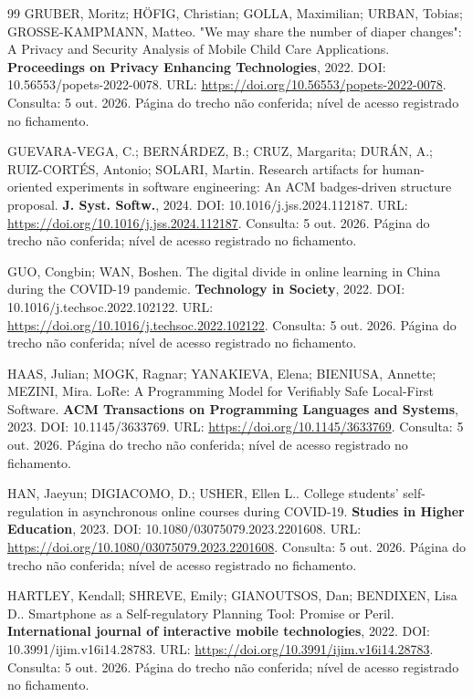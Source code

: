 \begin{thebibliography}{99}
 GRUBER, Moritz; HÖFIG, Christian; GOLLA, Maximilian; URBAN, Tobias; GROSSE-KAMPMANN, Matteo. "We may share the number of diaper changes": A Privacy and Security Analysis of Mobile Child Care Applications. \textbf{Proceedings on Privacy Enhancing Technologies}, 2022. DOI: 10.56553/popets-2022-0078. URL: \url{https://doi.org/10.56553/popets-2022-0078}. Consulta: 5 out. 2026. Página do trecho não conferida; nível de acesso registrado no fichamento.


 GUEVARA-VEGA, C.; BERNÁRDEZ, B.; CRUZ, Margarita; DURÁN, A.; RUIZ-CORTÉS, Antonio; SOLARI, Martin. Research artifacts for human-oriented experiments in software engineering: An ACM badges-driven structure proposal. \textbf{J. Syst. Softw.}, 2024. DOI: 10.1016/j.jss.2024.112187. URL: \url{https://doi.org/10.1016/j.jss.2024.112187}. Consulta: 5 out. 2026. Página do trecho não conferida; nível de acesso registrado no fichamento.


 GUO, Congbin; WAN, Boshen. The digital divide in online learning in China during the COVID-19 pandemic. \textbf{Technology in Society}, 2022. DOI: 10.1016/j.techsoc.2022.102122. URL: \url{https://doi.org/10.1016/j.techsoc.2022.102122}. Consulta: 5 out. 2026. Página do trecho não conferida; nível de acesso registrado no fichamento.


 HAAS, Julian; MOGK, Ragnar; YANAKIEVA, Elena; BIENIUSA, Annette; MEZINI, Mira. LoRe: A Programming Model for Verifiably Safe Local-First Software. \textbf{ACM Transactions on Programming Languages and Systems}, 2023. DOI: 10.1145/3633769. URL: \url{https://doi.org/10.1145/3633769}. Consulta: 5 out. 2026. Página do trecho não conferida; nível de acesso registrado no fichamento.


 HAN, Jaeyun; DIGIACOMO, D.; USHER, Ellen L.. College students’ self-regulation in asynchronous online courses during COVID-19. \textbf{Studies in Higher Education}, 2023. DOI: 10.1080/03075079.2023.2201608. URL: \url{https://doi.org/10.1080/03075079.2023.2201608}. Consulta: 5 out. 2026. Página do trecho não conferida; nível de acesso registrado no fichamento.


 HARTLEY, Kendall; SHREVE, Emily; GIANOUTSOS, Dan; BENDIXEN, Lisa D.. Smartphone as a Self-regulatory Planning Tool: Promise or Peril. \textbf{International journal of interactive mobile technologies}, 2022. DOI: 10.3991/ijim.v16i14.28783. URL: \url{https://doi.org/10.3991/ijim.v16i14.28783}. Consulta: 5 out. 2026. Página do trecho não conferida; nível de acesso registrado no fichamento.



\end{thebibliography}
